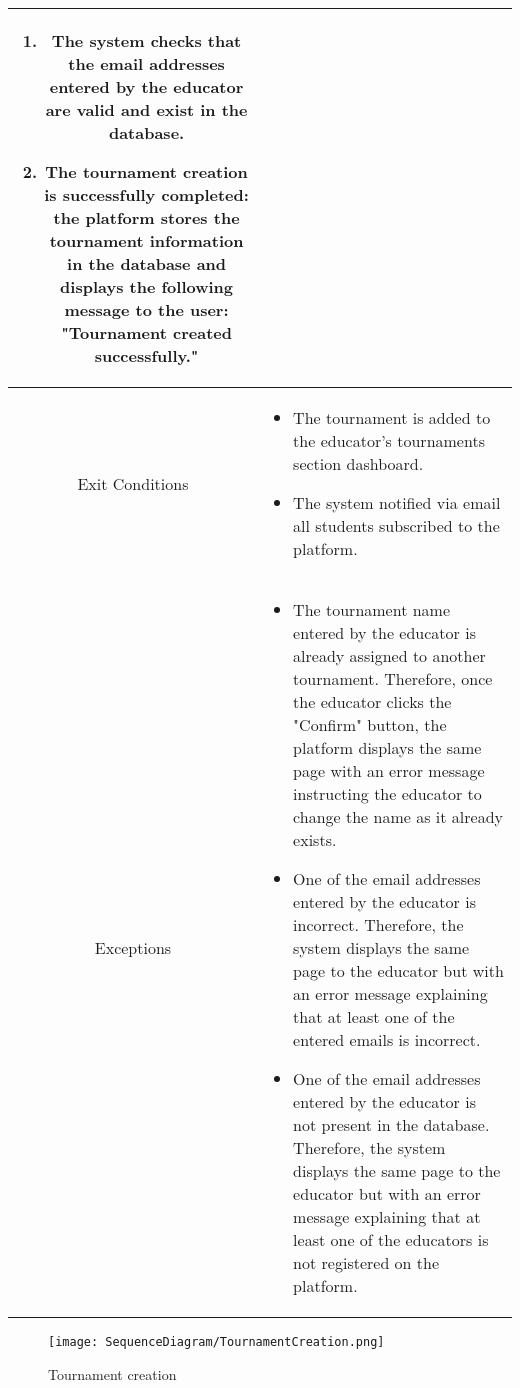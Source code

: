 \begin{longtable}{|c| p{10cm}|}
\begin{enumerate}
                                \item The system checks that the email addresses entered by the educator are valid and exist in the database.
                                \item The tournament creation is successfully completed: the platform stores the tournament information in the database and displays the following message to the user: "Tournament created successfully."
                            \end{enumerate} \\
                            \hline
            Exit Conditions &
            \begin{itemize}
                                    \item The tournament is added to the educator's tournaments section dashboard.
                                    \item The system notified via email all students subscribed to the platform.
                                \end{itemize}\\
        \hline
            Exceptions & \begin{itemize}
                \item The tournament name entered by the educator is already assigned to another tournament. Therefore, once the educator clicks the "Confirm" button, the platform displays the same page with an error message instructing the educator to change the name as it already exists.
                \item One of the email addresses entered by the educator is incorrect. Therefore, the system displays the same page to the educator but with an error message explaining that at least one of the entered emails is incorrect.
                \item One of the email addresses entered by the educator is not present in the database. Therefore, the system displays the same page to the educator but with an error message explaining that at least one of the educators is not registered on the platform.
            \end{itemize} \\
        \hline
    \end{longtable}

    \begin{figure}[H]
  \texttt{[image: SequenceDiagram/TournamentCreation.png]} 
  \caption{Tournament creation}
  \label{fig:immagine}
\end{figure}

